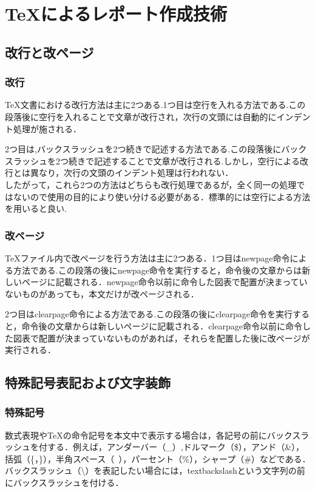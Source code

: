\documentclass[a4paper, 11pt, titlepage]{jsarticle}
\begin{document}
\section{\TeX によるレポート作成技術}
\subsection{改行と改ページ}
\subsubsection{改行}
\TeX 文書における改行方法は主に2つある.1つ目は空行を入れる方法である.この段落後に空行を入れることで文章が改行され，次行の文頭には自動的にインデント処理が施される．

2つ目は,バックスラッシュを2つ続きで記述する方法である.この段落後にバックスラッシュを2つ続きで記述することで文章が改行される.しかし，空行による改行とは異なり，次行の文頭のインデント処理は行われない．\\
したがって，これら2つの方法はどちらも改行処理であるが，全く同一の処理ではないので使用の目的により使い分ける必要がある．標準的には空行による方法を用いると良い.

\subsubsection{改ページ}
\TeX ファイル内で改ページを行う方法は主に2つある．1つ目はnewpage命令による方法である.この段落の後にnewpage命令を実行すると，命令後の文章からは新しいページに記載される．newpage命令以前に命令した図表で配置が決まっていないものがあっても，本文だけが改ページされる．
\newpage

2つ目はclearpage命令による方法である.この段落の後にclearpage命令を実行すると，命令後の文章からは新しいページに記載される．clearpage命令以前に命令した図表で配置が決まっていないものがあれば，それらを配置した後に改ページが実行される．
\clearpage

\subsection{特殊記号表記および文字装飾}
\subsubsection{特殊記号}
数式表現や\TeX の命令記号を本文中で表示する場合は，各記号の前にバックスラッシュを付する．例えば，アンダーバー（\_）,ドルマーク（\$），アンド（\&），括弧（\{，\}），半角スペース（\ ），パーセント（\%），シャープ（\#）などである．バックスラッシュ（\textbackslash ）を表記したい場合には，textbackslashという文字列の前にバックスラッシュを付ける．
\end{document}
